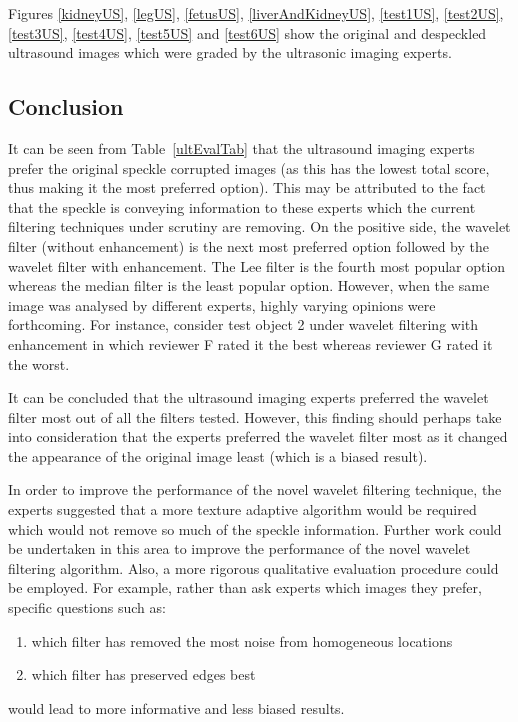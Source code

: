 \documentclass[12pt]{report}
\begin{document}
Figures \ref{kidneyUS}, \ref{legUS}, 
\ref{fetusUS}, 
\ref{liverAndKidneyUS}, 
\ref{test1US}, \ref{test2US}, \ref{test3US}, 
\ref{test4US}, \ref{test5US} and \ref{test6US} show the original and despeckled
ultrasound images which were graded by the ultrasonic imaging experts.

\subsection{Conclusion}
It can be seen from Table~\ref{ultEvalTab} that the ultrasound imaging experts prefer the original speckle 
corrupted images (as this has the lowest total score, thus making it the most preferred option). 
This may be attributed to the fact that the speckle is conveying
information to these experts which the current filtering techniques under scrutiny are removing.
On the positive side, the wavelet filter (without enhancement) is the next most preferred option
followed by the wavelet filter with enhancement. The Lee filter is the fourth most popular option whereas
the median filter is the least popular option. 
However, when the same image was analysed by different experts, highly varying opinions were
forthcoming. For instance, consider test object 2 under wavelet filtering with enhancement in which
reviewer F rated it the best whereas reviewer G rated it the worst.

It can be concluded that the ultrasound imaging experts preferred the wavelet filter most out of all the filters tested.
However, this finding should perhaps take into consideration that the experts 
preferred the wavelet filter most as it changed the appearance of the original image least (which is a biased result).

In order to improve the performance of the novel wavelet filtering technique,
the experts suggested that a more texture adaptive algorithm would be required which would not remove so much of
the speckle information. 
Further work could be undertaken in this area to improve the performance of the novel wavelet filtering algorithm.
Also, a more rigorous qualitative evaluation procedure could be employed. For example, rather than ask experts which
images they prefer, specific questions such as:
\begin{enumerate}
\item which filter has removed the most noise from homogeneous locations 
\item which filter has preserved edges best
\end{enumerate}
would lead to more informative and less biased results.
\end{document}
